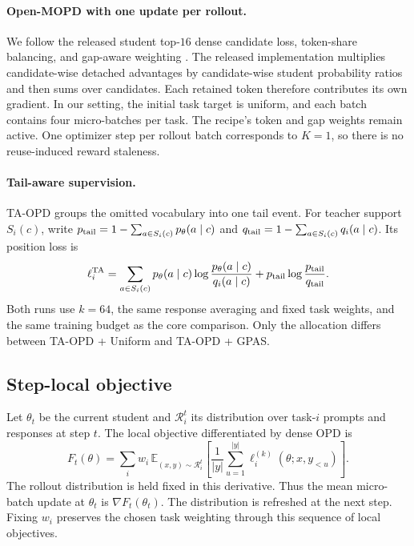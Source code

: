 \paragraph{Open-MOPD with one update per rollout.}
We follow the released student top-$16$ dense candidate loss,
token-share balancing, and gap-aware weighting
\citep{gao2026openmopddiagnosingfixingcapability,openmopd2026code}.
The released implementation multiplies candidate-wise detached
advantages by candidate-wise student probability ratios and then
sums over candidates. Each retained token therefore contributes its own gradient. In our setting, the initial task target is uniform, and each
batch contains four micro-batches per task. The recipe's token and
gap weights remain active. One optimizer step per rollout batch
corresponds to $K=1$, so there is no reuse-induced reward staleness.

\paragraph{Tail-aware supervision.}
TA-OPD \citep{huang2026tailaware} groups the omitted vocabulary
into one tail event. For teacher support $S_i(c)$, write
$p_{\rm tail}=1-\sum_{a\in S_i(c)}p_\theta(a\mid c)$ and
$q_{\rm tail}=1-\sum_{a\in S_i(c)}q_i(a\mid c)$. Its position loss is
\begin{equation}
    \ell_i^{\rm TA}=
       \sum_{a\in S_i(c)}p_\theta(a\mid c)
                     \log\frac{p_\theta(a\mid c)}{q_i(a\mid c)}
       +p_{\rm tail}\log\frac{p_{\rm tail}}{q_{\rm tail}}.
\end{equation}
Both runs use $k=64$, the same response averaging and fixed task
weights, and the same training budget as the core comparison.
Only the allocation differs between TA-OPD + Uniform and
TA-OPD + GPAS.

\subsection{Step-local objective}
\label{app:local_objective}

Let $\theta_t$ be the current student and $\mathcal R_i^t$ its
distribution over task-$i$ prompts and responses at step $t$.
The local objective differentiated by dense OPD is
\begin{equation}
    F_t(\theta)=
       \sum_i w_i\,\mathbb E_{(x,y)\sim\mathcal R_i^t}
       \left[\frac1{|y|}\sum_{u=1}^{|y|}
            \ell_i^{(k)}(\theta;x,y_{<u})\right].
\end{equation}
The rollout distribution is held fixed in this derivative. Thus the
mean micro-batch update at $\theta_t$ is $\nabla F_t(\theta_t)$.
The distribution is refreshed at the next step. Fixing $w_i$ preserves
the chosen task weighting through this sequence of local objectives.

